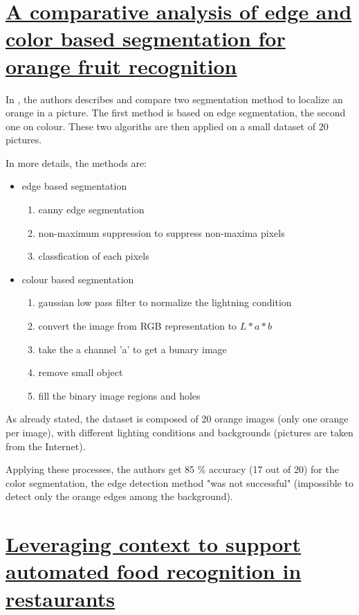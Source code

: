\section{\href{http://ieeexplore.ieee.org/xpls/abs_all.jsp?arnumber=6949884}{A comparative analysis of edge and color based segmentation for orange fruit recognition}}

In \cite{Thendral2014a}, the authors describes and compare two segmentation method to localize an orange in a picture. The first method is based on edge segmentation, the second one on colour. These two algoriths are then applied on a small dataset of 20 pictures.

In more details, the methods are:
\begin{itemize}
    \item edge based segmentation
    \begin{enumerate}
        \item canny edge segmentation
        \item non-maximum suppression to suppress non-maxima pixels
        \item classfication of each pixels
    \end{enumerate}
    \item colour based segmentation
    \begin{enumerate}
        \item gaussian low pass filter to normalize the lightning condition
        \item convert the image from RGB representation to $L * a * b$
        \item take the a channel 'a' to get a bunary image
        \item remove small object
        \item fill the binary image regions and holes
    \end{enumerate}
\end{itemize}

As already stated, the dataset is composed of 20 orange images (only one orange per image), with different lighting conditions and backgrounds (pictures are taken from the Internet).

Applying these processes, the authors get 85 \% accuracy (17 out of 20) for the color segmentation, the edge detection method "was not successful" (impossible to detect only the orange edges among the background).

\section{\href{http://www.vbettadapura.com/egocentric/food/}{Leveraging context to support automated food recognition in restaurants}}

